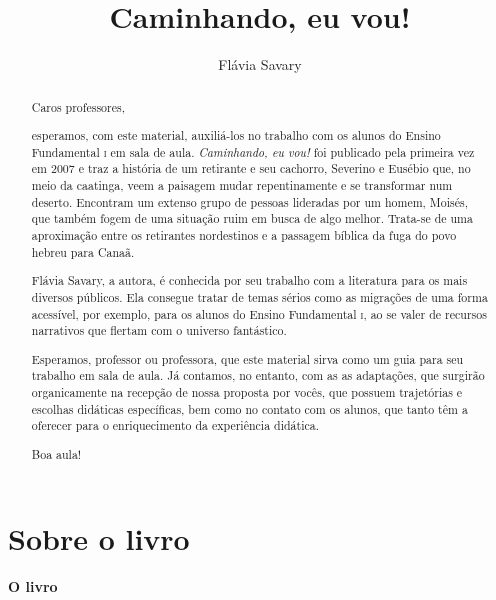 \documentclass[11pt]{extarticle}
\newcommand{\AutorLivro}{Flávia Savary}
\newcommand{\TituloLivro}{Caminhando, eu vou!}
\newcommand{\colaborador}{Renier Silva}
\begin{document}
\title{\TituloLivro}
\author{\AutorLivro}
\def\authornotes{\colaborador}

\date{}
\maketitle


\tableofcontents


\begin{abstract}

Caros professores, 

esperamos, com este material, auxiliá-los no trabalho com os alunos 
do Ensino Fundamental \textsc{i} em sala de aula. \textit{Caminhando, eu vou!} foi publicado
pela primeira vez em 2007 e traz a história de um retirante e seu cachorro, Severino e Eusébio que,
no meio da caatinga, veem a paisagem mudar repentinamente e se transformar num deserto.
Encontram um extenso grupo de pessoas lideradas por um homem, Moisés, que também fogem de uma situação 
ruim em busca de algo melhor. Trata-se de uma aproximação entre os retirantes nordestinos
e a passagem bíblica da fuga do povo hebreu para Canaã. 

Flávia Savary, a autora, é conhecida por seu trabalho com a literatura para
os mais diversos públicos. Ela consegue tratar de temas sérios como as migrações
de uma forma acessível, por exemplo, para os alunos do Ensino Fundamental \textsc{i},
ao se valer de recursos narrativos que flertam com o universo fantástico. 

Esperamos, professor ou professora, que este material sirva como um guia 
para seu trabalho em sala de aula. Já contamos, no entanto, com as as adaptações,
que surgirão organicamente na recepção de nossa proposta por vocês, que possuem 
trajetórias e escolhas didáticas específicas, bem como no contato com os 
alunos, que tanto têm a oferecer para o enriquecimento da experiência didática.

Boa aula!

\end{abstract}

\section{Sobre o livro}

\paragraph{O livro} 
\end{document}
